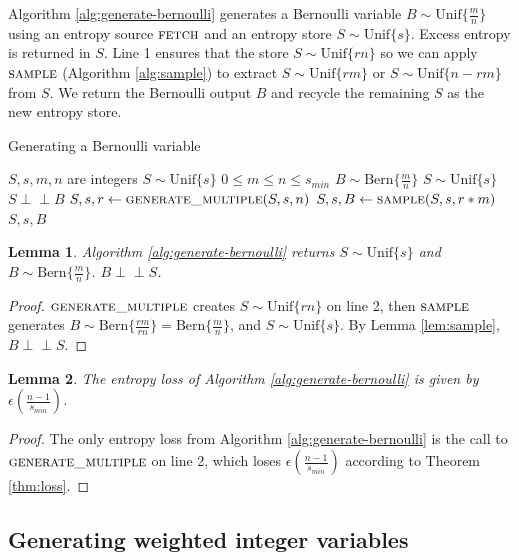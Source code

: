 \documentclass[12pt]{article}
\newtheorem{lemma}{Lemma}
\newcommand{\indep}{\perp\!\!\!\perp}
\newcommand{\unif}[1]{\mathrm{Unif}\{#1\}}
\newcommand{\bern}[1]{\mathrm{Bern}\{#1\}}
\begin{document}
Algorithm \ref{alg:generate-bernoulli} generates a Bernoulli variable $B \sim \unif{\frac{m}{n}}$ using an entropy source $\textsc{fetch}$ and an entropy store $S \sim \unif{s}$. Excess entropy is returned in $S$. Line 1 ensures that the store $S \sim \unif{rn}$ so we can apply $\textsc{sample}$ (Algorithm \ref{alg:sample}) to extract $S \sim \unif{rm}$ or $S \sim \unif{n-rm}$ from $S$. We return the Bernoulli output $B$ and recycle the remaining $S$ as the new entropy store.

\begin{algorithm}
\caption{Generating a Bernoulli variable}
\label{alg:generate-bernoulli}
\begin{algorithmic}[1]
\Require $S, s, m, n$ are integers
\Require $S \sim \unif{s}$
\Require $0 \le m \le n\le s_{min}$
\Ensure $B \sim \bern{\frac{m}{n}}$
\Ensure $S \sim \unif{s}$
\Ensure $S \indep B$
  \State $S, s, r \gets \textsc{generate\_multiple}(S, s, n)$
  \State $S, s, B \gets \textsc{sample}(S, s, r * m)$
  \State \Return $S, s, B$
\EndProcedure
\end{algorithmic}
\end{algorithm}

\begin{lemma}
Algorithm \ref{alg:generate-bernoulli} returns $S \sim \unif{s}$ and $B \sim \bern{\frac{m}{n}}$. $B \indep S$.
\end{lemma}

\begin{proof}
    $\textsc{generate\_multiple}$ creates $S \sim \unif{rn}$ on line 2, then $\textsc{sample}$ generates $B \sim \bern{\frac{rm}{rn}} = \bern{\frac{m}{n}}$, and $S \sim \unif{s}$. By Lemma \ref{lem:sample}, $B \indep S$.
\end{proof}

\begin{lemma}
The entropy loss of Algorithm \ref{alg:generate-bernoulli} is given by $\epsilon(\frac{n-1}{s_{min}})$.
\end{lemma}

\begin{proof}
    The only entropy loss from Algorithm \ref{alg:generate-bernoulli} is the call to $\textsc{generate\_multiple}$ on line 2, which loses $\epsilon(\frac{n-1}{s_{min}})$ according to Theorem \ref{thm:loss}.
\end{proof}

\subsection{Generating weighted integer variables}
\end{document}
